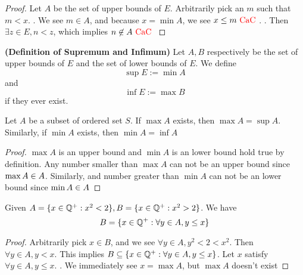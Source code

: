 \documentclass{report}
\begin{document}
\begin{proof}

Let $A$ be the set of upper bounds of  $E$. Arbitrarily pick an $m$ such that $m<x$. . We see $m\in A$, and because $x=\min A$, we see $x\leq m\text{ \textcolor{red}{CaC} }$. . Then $\exists z\in E, n<z$, which implies $n\not\in A\text{ \textcolor{red}{CaC} }$
\end{proof}
\begin{definition}
\textbf{(Definition of Supremum and Infimum)} Let $A,B$ respectively be the set of upper bounds of  $E$ and the set of lower bounds of  $E$. We define
\begin{equation}
\sup E:=\min A
\end{equation}
and
\begin{equation}
\inf E:=\max B
\end{equation}
if they ever exist.
\end{definition}
\begin{theorem}
Let $A$ be a subset of ordered set  $S$. If  $\max A$ exists, then $\max A=\sup A$. Similarly, if $\min A$ exists, then $\min A=\inf A$
\end{theorem}
\begin{proof}
$\max A$ is an upper bound and $\min  A$ is an lower bound hold true by definition. Any number smaller than $\max A$ can not be an upper bound since $\max A\in A$. Similarly, and number greater than $\min A$ can not be an lower bound since $\min A\in A$  
\end{proof}
\begin{theorem}
Given $A=\{ x\in\mathbb{Q}^+: x^2<2 \},B=\{ x\in\mathbb{Q}^+: x^2>2 \}$. We have
\begin{equation}
B=\{ x\in\mathbb{Q}^+ : \forall y\in A, y\leq x \}
\end{equation}
\end{theorem}
\begin{proof}
Arbitrarily pick $x\in B$, and we see $\forall y\in A, y^2<2<x^2$. Then $\forall y\in A,y<x$. This implies $B\subseteq \{ x\in\mathbb{Q}^+:\forall y\in A, y\leq x \}$. Let $x$ satisfy $\forall y\in A, y\leq x$. . We immediately see $x=\max A$, but $\max A$ doesn't exist \CaC
\end{proof}
\end{document}
